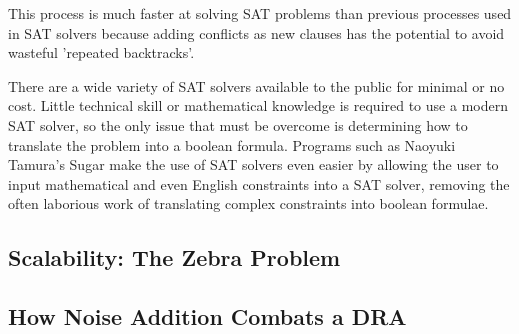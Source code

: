 \documentclass[jou,apacite]{apa6}
\begin{document}
This process is much faster at solving SAT problems than previous processes used in SAT solvers because adding conflicts as new clauses has the potential to avoid wasteful 'repeated backtracks'.

There are a wide variety of SAT solvers available to the public for minimal or no cost. Little technical skill or mathematical knowledge is required to use a modern SAT solver, so the only issue that must be overcome is determining how to translate the problem into a boolean formula. Programs such as Naoyuki Tamura's Sugar make the use of SAT solvers even easier by allowing the user to input mathematical and even English constraints into a SAT solver, removing the often laborious work of translating complex constraints into boolean formulae.

\subsection{Scalability: The Zebra Problem}

\subsection{How Noise Addition Combats a DRA}
\end{document}
